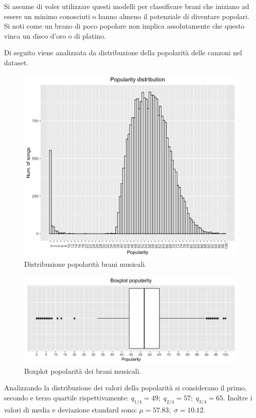 Si assume di voler utilizzare questi modelli per classificare brani
che iniziano ad essere un minimo conosciuti o hanno almeno il
potenziale di diventare popolari. Si noti come un brano di poco
popolare non implica assolutamente che questo vinca un disco d'oro o
di platino.

Di seguito viene analizzata da distribuzione della popolarità delle
canzoni nel dataset.


\begin{figure}[H]
	\centering
	\includegraphics[width=13cm]{../images/popularity_distribution.png}
	\caption{Distribuzione popolarità brani musicali.}
\end{figure}

\begin{figure}[H]
\centering
\includegraphics[width=14cm]{../images/popularity_boxplot.png}
\caption{Boxplot popolarità dei brani musicali.}
\end{figure}

Analizzando la distribuzione dei valori della popolarità si
considerano il primo, secondo e terzo quartile rispettivamente:
$q_{1/4} = 49; \; q_{2/4}= 57; \; q_{3/4} = 65$. Inoltre i valori di
media e deviazione standard sono: $\mu = 57.83; \; \sigma = 10.12$.

